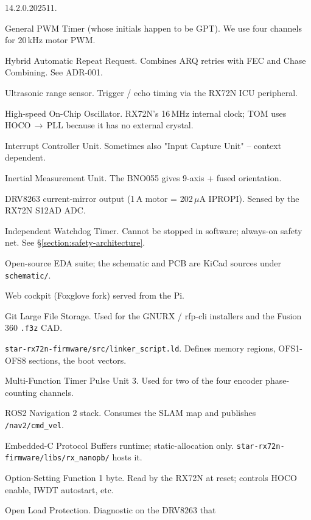 \begin{description}
        14.2.0.202511.
  \item[GPTW] General PWM Timer (whose initials happen to be GPT).
        We use four channels for 20\,kHz motor PWM.
  \item[HARQ] Hybrid Automatic Repeat Request. Combines ARQ retries
        with FEC and Chase Combining. See ADR-001.
  \item[HC-SR04] Ultrasonic range sensor. Trigger / echo timing via
        the RX72N ICU peripheral.
  \item[HOCO] High-speed On-Chip Oscillator. RX72N's 16\,MHz internal
        clock; TOM uses HOCO\,$\rightarrow$\,PLL because it has no
        external crystal.
  \item[ICU] Interrupt Controller Unit. Sometimes also "Input Capture
        Unit" -- context dependent.
  \item[IMU] Inertial Measurement Unit. The BNO055 gives 9-axis +
        fused orientation.
  \item[IPROPI] DRV8263 current-mirror output (1\,A motor =
        202\,$\mu$A IPROPI). Sensed by the RX72N S12AD ADC.
  \item[IWDT] Independent Watchdog Timer. Cannot be stopped in
        software; always-on safety net. See \S\ref{section:safety-architecture}.
  \item[KiCad] Open-source EDA suite; the schematic and PCB are
        KiCad sources under \texttt{schematic/}.
  \item[Lichtblick] Web cockpit (Foxglove fork) served from the Pi.
  \item[LFS] Git Large File Storage. Used for the GNURX /
        rfp-cli installers and the Fusion 360 \texttt{.f3z} CAD.
  \item[Linker script] \texttt{star-rx72n-firmware/src/linker\_script.ld}.
        Defines memory regions, OFS1-OFS8 sections, the boot vectors.
  \item[MTU3] Multi-Function Timer Pulse Unit 3. Used for two of the
        four encoder phase-counting channels.
  \item[Nav2] ROS2 Navigation 2 stack. Consumes the SLAM map and
        publishes \texttt{/nav2/cmd\_vel}.
  \item[nanopb] Embedded-C Protocol Buffers runtime; static-allocation
        only. \texttt{star-rx72n-firmware/libs/rx\_nanopb/} hosts it.
  \item[OFS1] Option-Setting Function 1 byte. Read by the RX72N at
        reset; controls HOCO enable, IWDT autostart, etc.
  \item[OLP] Open Load Protection. Diagnostic on the DRV8263 that

\end{description}
